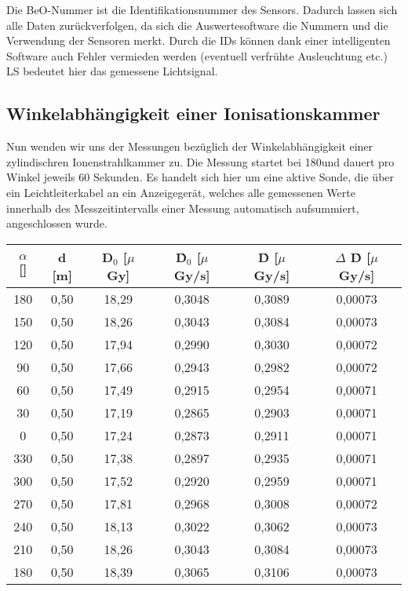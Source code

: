 Die BeO-Nummer ist die Identifikationsnummer des Sensors. Dadurch lassen sich alle Daten zurückverfolgen, da sich die Auswertesoftware die Nummern und die Verwendung der Sensoren merkt. Durch die IDs können dank einer intelligenten Software auch Fehler vermieden werden (eventuell verfrühte Ausleuchtung etc.) LS bedeutet hier das gemessene Lichtsignal.
		
\subsection{Winkelabhängigkeit einer Ionisationskammer} \label{sec:Ionkammer}

Nun wenden wir uns der Messungen bezüglich der Winkelabhängigkeit einer zylindischren Ionenstrahlkammer zu. Die Messung startet bei 180\textdegree und dauert pro Winkel jeweils 60 Sekunden.
Es handelt sich hier um eine aktive Sonde, die über ein Leichtleiterkabel an ein Anzeigegerät, welches alle gemessenen Werte innerhalb des Messzeitintervalls einer Messung automatisch aufsummiert, angeschlossen wurde.

\vspace{5mm}
	\begin{center}
		\begin{tabular}{c|c|c|c|c|c}
				\textbf{$\alpha$} [\textdegree] & \textbf{d} [m] & \textbf{D$_0$} [$\mu$Gy] & \textbf{\.D$_0$} [$\mu$Gy/s] & \textbf{\.D} [$\mu$ Gy/s] & $\Delta$ \textbf{\.D} [$\mu$Gy/s]\\ 
		\hline	180 & 0,50 & 18,29 & 0,3048 & 0,3089 & 0,00073 \\ 
				150 & 0,50 & 18,26 & 0,3043 & 0,3084 & 0,00073 \\ 
				120 & 0,50 & 17,94 & 0,2990 & 0,3030 & 0,00072 \\ 
				90  & 0,50 & 17,66 & 0,2943 & 0,2982 & 0,00072 \\ 
				60  & 0,50 & 17,49 & 0,2915 & 0,2954 & 0,00071 \\ 
				30  & 0,50 & 17,19 & 0,2865 & 0,2903 & 0,00071 \\ 
				0   & 0,50 & 17,24 & 0,2873 & 0,2911 & 0,00071 \\ 
				330 & 0,50 & 17,38 & 0,2897 & 0,2935 & 0,00071 \\ 
				300 & 0,50 & 17,52 & 0,2920 & 0,2959 & 0,00071 \\ 
				270 & 0,50 & 17,81 & 0,2968 & 0,3008 & 0,00072 \\ 
				240 & 0,50 & 18,13 & 0,3022 & 0,3062 & 0,00073 \\ 
			    210 & 0,50 & 18,26 & 0,3043 & 0,3084 & 0,00073 \\ 
		\hline	180 & 0,50 & 18,39 & 0,3065 & 0,3106 & 0,00073 \\ 
		\end{tabular} 
		\label{dft:Winkel}
	\end{center}
\vspace{5mm}				

